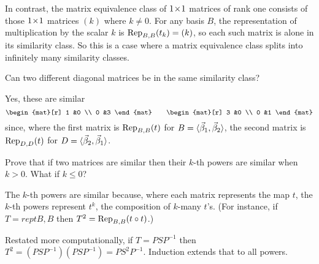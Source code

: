 \begin{exercises}
\begin{answer}
      In contrast, the matrix equivalence class of \( \nbyn{1} \) matrices
      of rank one consists of those 
      $\nbyn{1}$ matrices \( (k) \) where \( k\neq 0 \).
      For any basis \( B \), the representation
      of multiplication by the scalar \( k \)
      is \( \rep{t_k}{B,B}=(k) \),
      so each such matrix is alone in its similarity class.
      So this is a case where a matrix equivalence class splits into
      infinitely many similarity classes.  
     \end{answer}
  \item 
    Can two different diagonal matrices be in the same similarity class?
    \begin{answer}
      Yes, these are similar
      \begin{equation*}
         \begin{mat}[r]
           1  &0  \\
           0  &3
         \end{mat}
         \qquad
         \begin{mat}[r]
           3  &0  \\
           0  &1
         \end{mat}
      \end{equation*}
      since, where the first matrix is $\rep{t}{B,B}$ for 
      $B=\sequence{\vec{\beta}_1,\vec{\beta}_2}$, 
      the second matrix is $\rep{t}{D,D}$ for 
      $D=\sequence{\vec{\beta}_2,\vec{\beta}_1}$.
     \end{answer}
  \recommended \item
    Prove that if two matrices are similar then their \( k \)-th powers
    are similar when \( k>0 \).
    What if \( k\leq 0 \)?
    \begin{answer}
      The \( k \)-th powers are similar because, where each matrix represents
      the map $t$, the $k$-th powers represent
      \( t^k \), the composition of $k$-many $t$'s.
      (For instance, if $T=rep{t}{B,B}$ then $T^2=\rep{\composed{t}{t}}{B,B}$.)

      Restated more computationally, if \( T=PSP^{-1} \) then
      \( T^2=(PSP^{-1})(PSP^{-1})=PS^2P^{-1} \).
      Induction extends that to all powers.


\end{answer}
\end{exercises}
